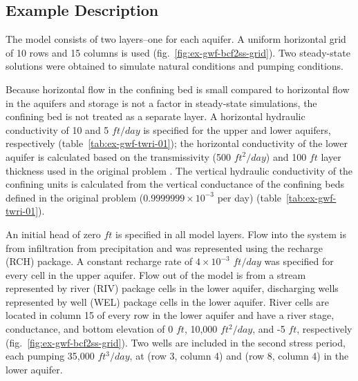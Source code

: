\subsection{Example Description}
The model consists of two layers--one for each aquifer. A uniform horizontal grid of 10 rows and 15 columns is used (fig.~\ref{fig:ex-gwf-bcf2ss-grid}). Two steady-state solutions were obtained to simulate natural conditions and pumping conditions. 

Because horizontal flow in the confining bed is small compared to horizontal flow in the aquifers and storage is not a factor in steady-state simulations, the confining bed is not treated as a separate layer. A horizontal hydraulic conductivity of 10 and 5 $ft/day$ is specified for the upper and lower aquifers, respectively (table~\ref{tab:ex-gwf-twri-01}); the horizontal conductivity of the lower aquifer is calculated based on the transmissivity (500 $ft^2/day$) and 100 $ft$ layer thickness used in the original problem \citep{mcdonaldetal1991wetdry}. The vertical hydraulic conductivity of the confining units is calculated from the vertical conductance of the confining beds defined in the original problem ($0.9999999 \times 10^{-3}$ per day)  (table~\ref{tab:ex-gwf-twri-01}).



An initial head of zero $ft$ is specified in all model layers. Flow into the system is from infiltration from precipitation and was represented using the recharge (RCH) package. A constant recharge rate of $4 \times 10^{-3}$ $ft/day$ was specified for every cell in the upper aquifer. Flow out of the model is from a stream represented by river (RIV) package cells in the lower aquifer, discharging wells represented by well (WEL) package cells in the lower aquifer. River cells are located in column 15 of every row in the lower aquifer and have a river stage, conductance, and bottom elevation of 0 $ft$, 10,000 $ft^2/day$, and -5 $ft$, respectively (fig.~\ref{fig:ex-gwf-bcf2ss-grid}). Two wells are included in the second stress period, each pumping 35,000 $ft^3/day$, at (row 3, column 4) and (row 8, column 4) in the lower aquifer. 

